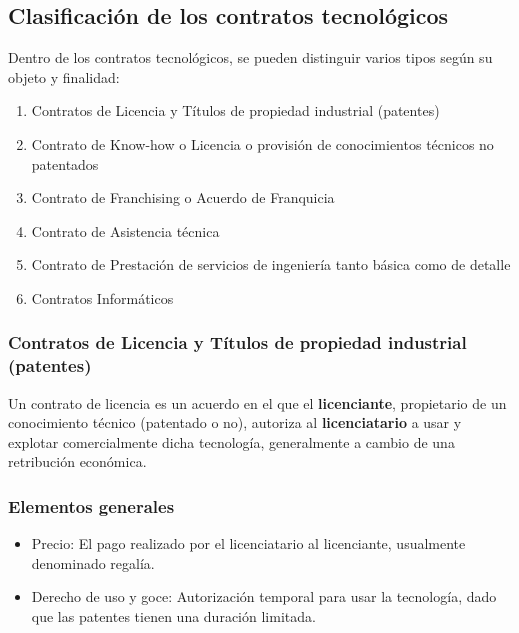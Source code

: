 \documentclass{templateNote}
\begin{document}
\subsection{Clasificación de los contratos tecnológicos}
Dentro de los contratos tecnológicos, se pueden distinguir varios tipos según su objeto y finalidad:
\begin{enumerate}
    \item Contratos de Licencia y Títulos de propiedad industrial (patentes)
    \item Contrato de Know-how o Licencia o provisión de conocimientos técnicos no patentados
    \item Contrato de Franchising o Acuerdo de Franquicia
    \item Contrato de Asistencia técnica
    \item Contrato de Prestación de servicios de ingeniería tanto básica como de detalle
    \item Contratos Informáticos
\end{enumerate}

\subsubsection{Contratos de Licencia y Títulos de propiedad industrial (patentes)}
Un contrato de licencia es un acuerdo en el que el \textbf{licenciante}, propietario de un conocimiento técnico (patentado o no), autoriza al \textbf{licenciatario} a usar y explotar comercialmente dicha tecnología, generalmente a cambio de una retribución económica.

\subsubsection*{Elementos generales}
\begin{itemize}
    \item Precio: El pago realizado por el licenciatario al licenciante, usualmente denominado regalía.
    \item Derecho de uso y goce: Autorización temporal para usar la tecnología, dado que las patentes tienen una duración limitada.
\end{itemize}
\end{document}
